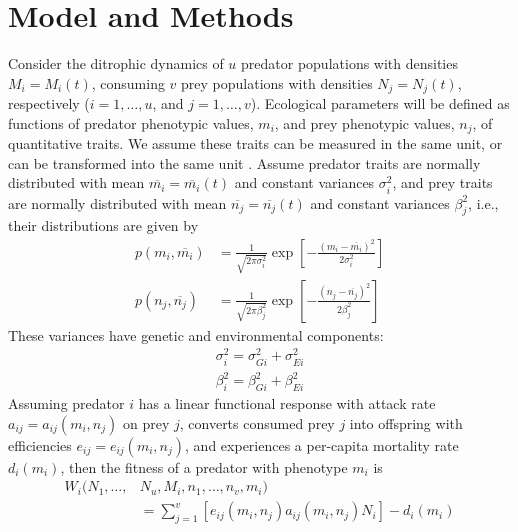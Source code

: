 \documentclass{amsart}
\theoremstyle{definition}
\theoremstyle{remark}
\numberwithin{equation}{section}
\begin{document}
\section{Model and Methods}

Consider the ditrophic dynamics of $u$ predator populations with densities $M_i = M_i(t)$, consuming $v$ prey populations with densities $N_j = N_j(t)$, respectively ($i = 1, \dots, u$, and $j = 1, \dots, v$).  Ecological parameters will be defined as functions of predator phenotypic values, $m_i$, and prey phenotypic values, $n_j$, of quantitative traits.  We assume these traits can be measured in the same unit, or can be transformed into the same unit \cite{Saloniemi_1993}.  Assume predator traits are normally distributed with mean $\overline{m_i} = \overline{m_i}(t)$ and constant variances $\sigma_i^2$, and prey traits are normally distributed with mean $\overline{n_j} = \overline{n_j}(t)$ and constant variances $\beta_j^2$, i.e., their distributions are given by
\begin{equation}
	\label{distributions}
	\begin{aligned}
		p(m_i, \overline{m_i}) &= \frac{1}{\sqrt{2\pi\sigma_i^2}}\exp\left[-\frac{(m_i - \overline{m_i})^2}{2\sigma_i^2}\right] \\
		p(n_j, \overline{n_j}) &= \frac{1}{\sqrt{2\pi\beta_j^2}}\exp\left[-\frac{(n_j - \overline{n_j})^2}{2\beta_j^2}\right]
	\end{aligned}
\end{equation}
These variances have genetic and environmental components:
\begin{equation}
	\label{variances}
	\begin{aligned}
		\sigma_i^2 = \sigma_{Gi}^2 + \sigma_{Ei}^2 \\
		\beta_i^2 = \beta_{Gi}^2 + \beta_{Ei}^2
	\end{aligned}
\end{equation}
Assuming predator $i$ has a linear functional response with attack rate $a_{ij} = a_{ij}(m_i, n_j)$ on prey $j$, converts consumed prey $j$ into offspring with efficiencies $e_{ij} = e_{ij}(m_i, n_j)$, and experiences a per-capita mortality rate $d_i(m_i)$, then the fitness of a predator with phenotype $m_i$ is
\begin{equation}
	\label{predator_fitness}
	\begin{aligned}
		W_i(N_1, \dots, &N_u, M_i, n_1, \dots, n_v, m_i) \\
		&= \sum\limits_{j = 1}^{v}\left[e_{ij}(m_i, n_j)a_{ij}(m_i, n_j)N_i\right] - d_i(m_i)
	\end{aligned}
\end{equation}
\end{document}
